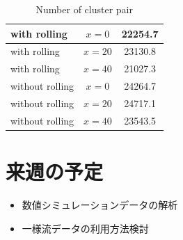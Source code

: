 \documentclass[twocolumn,a4j]{jsarticle}
\begin{document}
\begin{table}[hbtp]
  \centering
  \caption{Number of cluster pair}
  \begin{tabular}{l c c}
    \hline
    with rolling    & $x=0$  & 22254.7 \\ \hline
    with rolling    & $x=20$ & 23130.8 \\ \hline
    with rolling    & $x=40$ & 21027.3 \\ \hline
    without rolling & $x=0$  & 24264.7 \\ \hline
    without rolling & $x=20$ & 24717.1 \\ \hline
    without rolling & $x=40$ & 23543.5 \\ \hline
  \end{tabular}
\end{table}

\newpage
\section{来週の予定}
\begin{itemize}
  \item 数値シミュレーションデータの解析
  \item 一様流データの利用方法検討
\end{itemize}
\end{document}
